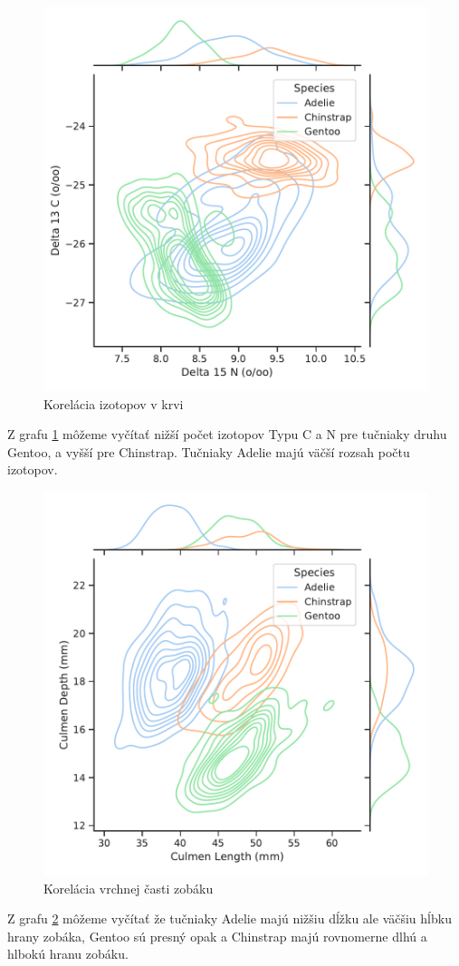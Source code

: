 \documentclass[a4paper, 16pt]{article}
\begin{document}
\begin{figure}[H]
    \centering
    \includegraphics[width=15cm]{graphs/isotopes_N_C.pdf}
    \caption{Korelácia izotopov v krvi}
    \label{fig:6}
\end{figure}
Z grafu \ref{fig:6} môžeme vyčítať nižší počet izotopov Typu C a N pre tučniaky druhu Gentoo, a vyšší pre Chinstrap.
Tučniaky Adelie majú väčší rozsah počtu izotopov.

\begin{figure}[H]
    \centering
    \includegraphics[width=15cm]{graphs/culmen_l_d.pdf}
    \caption{Korelácia vrchnej časti zobáku}
    \label{fig:7}
\end{figure}
Z grafu \ref{fig:7} môžeme vyčítať že tučniaky Adelie majú nižšiu dĺžku ale väčšiu hĺbku hrany zobáka, Gentoo sú presný opak a Chinstrap majú rovnomerne dlhú a hlbokú hranu zobáku.
\end{document}
